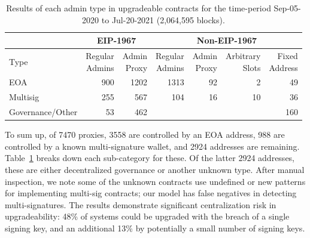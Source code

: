 \begin{table}[t]
\centering
\begin{tabular}{|l|r|r|r|r|r|r|}
\hline      &\multicolumn{2}{c|}{EIP-1967} & \multicolumn{4}{c|}{Non-EIP-1967}         \\
\hline
Type 				& \makecell{Regular\\Admins} & \makecell{Admin\\Proxy} 	& \makecell{Regular\\Admins} 	& \makecell{Admin\\Proxy} & \makecell{Arbitrary\\Slots} &  \makecell{Fixed\\Address}  \\ \hline 
EOA 				& 900  	& 1202		& 1313		& 92			& 2		& 49 		\\ 
Multisig 			& 255  	& 567		& 104		& 16			& 10		& 36		\\ 
Governance/Other 	& 53  	& 462		& 			& 			& 		& 160 	\\ \hline
\end{tabular}
\caption[Results of Admin Types]{\label{tab:admindata} Results of each admin type in upgradeable contracts for the time-period {Sep-05-2020} to {Jul-20-2021} (2,064,595 blocks).}
\vspace{-10pt}
\end{table}

To sum up, of 7470 proxies, 3558 are controlled by an EOA address, 988 are controlled by a known multi-signature wallet, and 2924 addresses are remaining. Table~\ref{tab:admindata} breaks down each sub-category for these. Of the latter 2924 addresses, these are either decentralized governance or another unknown type. After manual inspection, we note some of the unknown contracts use undefined or new patterns for implementing multi-sig contracts; our model has false negatives in detecting multi-signatures. The results demonstrate significant centralization risk in upgradeability: 48\% of systems could be upgraded with the breach of a single signing key, and an additional 13\% by potentially a small number of signing keys.



